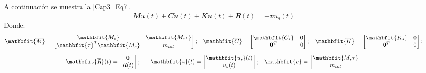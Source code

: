 A continuación se muestra la \ref{Cap3_Eq7}.
\begin{equation}\label{Cap3_Eq7}
	\mathbfit{\overline{M}\ddot{u}}(t)+\mathbfit{\overline{C}\dot{u}}(t)+\mathbfit{\overline{K}u}(t)+\mathbfit{\overline{R}}(t)=-\mathbfit{v}\ddot{u}_{g}(t)
\end{equation}
Donde:
\begin{subequations}\label{Cap3_Eq8}
	\begin{gather}
		\mathbfit{\overline{M}}=\begin{bmatrix}
			\mathbfit{M_{s}}                     & \mathbfit{M_{s} \tau} \\
			\mathbfit{\tau}^{T} \mathbfit{M_{s}} & m_{tot}
		\end{bmatrix};\hspace{3mm}
		\mathbfit{\overline{C}}=\begin{bmatrix}
			\mathbfit{C_{s}} & \mathbf{0} \\
			\mathbf{0}^{T}   & 0
		\end{bmatrix}; \hspace{3mm}
		\mathbfit{\overline{K}}=\begin{bmatrix}
			\mathbfit{K_{s}} & \mathbf{0} \\
			\mathbf{0}^{T}   & 0
		\end{bmatrix};		\label{Cap3_Eq8_1} \\[2 mm]
		\mathbfit{\overline{R}}(t)=\begin{bmatrix}
			\mathbf{0} \\
			R(t)
		\end{bmatrix};\hspace{6mm}
		\mathbfit{u}(t)=\begin{bmatrix}
			\mathbfit{u_{s}}(t) \\
			u_{b}(t)
		\end{bmatrix};\hspace{3mm}
		\mathbfit{v}=\begin{bmatrix}
			\mathbfit{M_{s} \tau} \\
			m_{tot}
		\end{bmatrix}
		\label{Cap3_Eq8_2}
	\end{gather}
\end{subequations}


